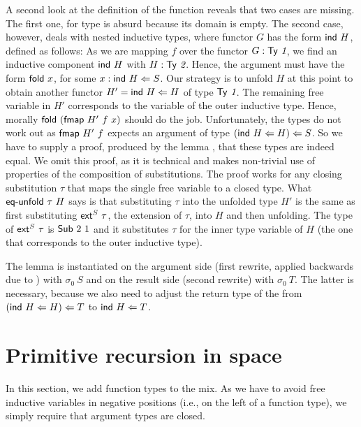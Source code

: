 \documentclass[a4paper,USenglish,cleveref, autoref, thm-restate]{lipics-v2021}
\begin{document}
A second look at the definition of the {\Afmap} function reveals that
two cases are missing. The first one, for type {\ATZ} is absurd
because its domain is empty. The second case, however, deals with
nested inductive types, where functor $G$ has the form $\Aind~H$, defined as follows:
\ccFunFmapSignature
\vspace{-1.5\baselineskip}
\ccFunFmapInd
As we are mapping $f$ over the functor $G : \ATy{~1}$, we find an
inductive component $\Aind~H$ with $H : \ATy{~2}$. Hence, the argument
must have the form $\Afold\ x$, for some $x : \Aind~H \Leftarrow S$.
Our strategy is to unfold $H$ at this point to obtain another functor
$H' = \Aind~H \Leftarrow H$ of type $\ATy{~1}$. The remaining free variable in $H'$
corresponds to the variable of the outer inductive type. Hence,
morally $\Afold~ (\Afmap~H'~f~x)$ should do the job. Unfortunately,
the types do not work out as $\Afmap~H'~f$ expects an argument of type
$(\Aind~H \Leftarrow H) \Leftarrow S$. So we have to supply a proof,
produced by the lemma \Aeq, that these types are indeed equal.
\ccEqUnfold
We omit this proof, as it is technical and makes non-trivial
use of properties of the composition of substitutions.
The proof works for any closing substitution $\tau$ that maps the
single free variable to a closed type. What {$\Aeq~\tau~H$} says is 
that substituting $\tau$ into the unfolded type $H'$ is the same as
first substituting $\Aext^S\ \tau$, the extension of $\tau$, into
$H$ and then unfolding. The type of $\Aext^S\ \tau$ is $\ASub~2~1$ and
it substitutes $\tau$ for the inner type variable of $H$ (the one that
corresponds to the outer inductive type). 

The {\Aeq} lemma is instantiated on the argument side (first rewrite,
applied backwards due to \Asym) with $\sigma_0~S$ and on the result
side (second rewrite) with $\sigma_0~T$. The latter is necessary, because we also need
to adjust the return type of the {\Afmap} from $(\Aind~H \Leftarrow H)
\Leftarrow T$ to $\Aind~H \Leftarrow T$. 


\section{Primitive recursion in space}
\label{sec:prim-recurs-space}


In this section, we add function types to the mix. As we have to avoid
free inductive variables in negative positions (i.e., on the left of a
function type), we simply require that argument types are closed.
\cccDataTy
\end{document}
